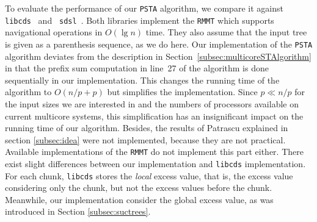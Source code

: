 To evaluate the performance of our {\tt PSTA} algorithm, we compare it against
{\tt libcds}~\cite{libcds} and {\tt
  sdsl}~\cite{sdsl}.
Both libraries implement the {\tt RMMT} which supports navigational operations in $O(\lg n)$ time.
They also assume that the input tree is given as a parenthesis sequence, as we
do here.
Our implementation of the {\tt PSTA} algorithm deviates from the description in
Section~\ref{subsec:multicoreSTAlgorithm} in that the prefix sum computation in
line~27 of the algorithm is done sequentially in our implementation.
This changes the running time of the algorithm to $O(n/p + p)$ but simplifies the
implementation.
Since $p \ll n/p$ for the input sizes we are interested in and the numbers of
processors available on current multicore systems, this simplification has an
insignificant impact on the running time of our algorithm. Besides, the results of
Patrascu explained in section \ref{subsec:idea} were not implemented, because they
are not practical. Available implementations of
the {\tt RMMT} do not implement this part either. There exist slight differences between
our implementation and {\tt libcds} implementation. For each chunk, {\tt libcds} stores
the \emph{local} excess value, that is, the excess value considering only the chunk, but not
the excess values before the chunk. Meanwhile, our implementation consider the global excess
value, as was introduced in Section \ref{subsec:suctrees}.